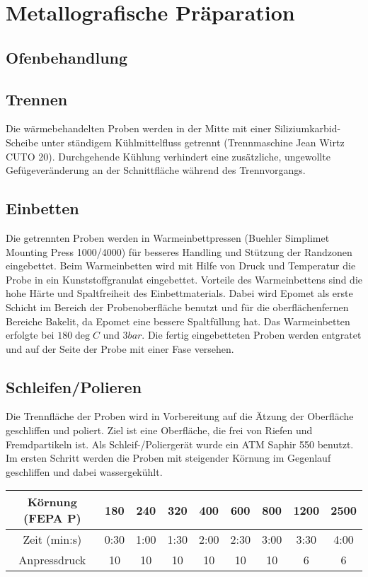 

\section {Metallografische Präparation}

\subsection{Ofenbehandlung }

\subsection{Trennen}
Die wärmebehandelten Proben werden in der Mitte mit einer Siliziumkarbid-Scheibe unter ständigem Kühlmittelfluss getrennt (Trennmaschine Jean Wirtz CUTO 20). Durchgehende Kühlung  verhindert eine zusätzliche, ungewollte Gefügeveränderung an der Schnittfläche während des Trennvorgangs.

 
\subsection{Einbetten}
Die getrennten Proben werden in Warmeinbettpressen (Buehler Simplimet Mounting Press 1000/4000) für besseres Handling und Stützung der Randzonen eingebettet. Beim Warmeinbetten wird mit Hilfe von Druck und Temperatur die Probe in ein Kunststoffgranulat eingebettet. Vorteile des Warmeinbettens sind die hohe Härte und Spaltfreiheit des Einbettmaterials. Dabei wird Epomet als erste Schicht im Bereich der Probenoberfläche benutzt und für die oberflächenfernen Bereiche Bakelit, da Epomet eine bessere Spaltfüllung hat. Das Warmeinbetten erfolgte bei $180 \deg C$ und $3 bar$. 
Die fertig eingebetteten Proben werden entgratet und auf der Seite der Probe mit einer Fase versehen.  


\subsection{Schleifen/Polieren}
 
Die Trennfläche der Proben wird in Vorbereitung auf die Ätzung der Oberfläche geschliffen und poliert. Ziel ist eine Oberfläche, die frei von Riefen und Fremdpartikeln ist. Als Schleif-/Poliergerät wurde ein ATM Saphir 550 benutzt.
Im ersten Schritt werden die Proben mit steigender Körnung im Gegenlauf geschliffen und dabei wassergekühlt. 


\begin{tabular}{|c|c|c|c|c|c|c|c|c|}
	\hline 
	Körnung (FEPA P) & 180 & 240 & 320 & 400 & 600 & 800 & 1200 & 2500 \\ 
	\hline 
	Zeit (min:s) & 0:30 & 1:00 & 1:30 & 2:00 & 2:30 & 3:00 & 3:30 & 4:00 \\ 
	\hline 
	Anpressdruck & 10&10&10&10&10&10&6&6\\
	\hline
\end{tabular} 


